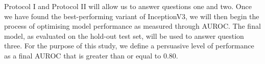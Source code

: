 \noindent
Protocol I and Protocol II will allow us to answer questions one and two. Once we have found the best-performing variant of InceptionV3, we will then begin the process of optimising model performance as measured through AUROC. The final model, as evaluated on the hold-out test set, will be used to answer question three. For the purpose of this study, we define a persuasive level of performance as a final AUROC that is greater than or equal to \(0.80\).






